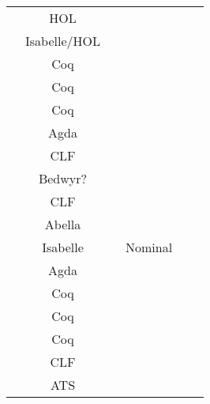 \begin{tabular}{l|c|c|c|c|l}
  \cite{Gordon1996}                  & HOL                    &           &         &             &             \\
  \cite{Gay2001}                     & Isabelle/HOL           &           &         &             &             \\
  \cite{Despeyroux2000}              & Coq                    &           &         &             &             \\
  \cite{Gillard2000}                 & Coq                    &           &         &             &             \\
  \cite{Honsell2001}                 & Coq                    &           &         &             &             \\
  \cite{Perera2018}                  & Agda                   &           &         &             &             \\
  \cite{Watkins2008}                 & CLF                    &           &         &             &             \\
  \cite{Tiu2010}                     & Bedwyr?                &           &         &             &             \\
  \cite{Cervesato2007}               & CLF                    &           &         &             &             \\
  \cite{Baelde2014}                  & Abella                 &           &         &             &             \\
  \cite{Bengtson2009}                & Isabelle               &           & Nominal &             &             \\
  \cite{Orchard2016}                 & Agda                   &           &         &             &             \\
  \cite{Castro2020}                  & Coq                    &           &         &             &             \\
  \cite{Zalakain2019}                & Coq                    &           &         &             &             \\
  \cite{Petz2016}                    & Coq                    &           &         &             &             \\
  \cite{Bock2016}                    & CLF                    &           &         &             &             \\
  \cite{Xi2016}                      & ATS                    &           &         &             &             \\

\end{tabular}
